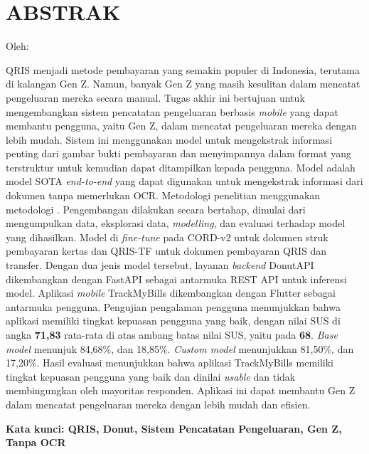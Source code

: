 \clearpage
\chapter*{ABSTRAK}
\begin{center}
	\center
	\begin{singlespace}
		\large\bfseries{\thetitle}

		\normalfont\normalsize
		Oleh:

		\bfseries \theauthor
	\end{singlespace}
\end{center}

\begin{singlespace}
	QRIS menjadi metode pembayaran yang semakin populer di Indonesia, terutama di kalangan Gen Z. Namun, banyak Gen Z yang masih kesulitan dalam mencatat pengeluaran mereka secara manual. Tugas akhir ini bertujuan untuk mengembangkan sistem pencatatan pengeluaran berbasis \emph{mobile} yang dapat membantu pengguna, yaitu Gen Z, dalam mencatat pengeluaran mereka dengan lebih mudah. Sistem ini menggunakan model \donut{} untuk mengekstrak informasi penting dari gambar bukti pembayaran dan menyimpannya dalam format yang terstruktur untuk kemudian dapat ditampilkan kepada pengguna. Model \donut{} adalah model SOTA \emph{end-to-end} yang dapat digunakan untuk mengekstrak informasi dari dokumen tanpa memerlukan OCR. Metodologi penelitian menggunakan metodologi \dsrm. Pengembangan dilakukan secara bertahap, dimulai dari mengumpulkan data, eksplorasi data, \emph{modelling}, dan evaluasi terhadap model yang dihasilkan. Model \donut{} di \emph{fine-tune} pada \dataset{} CORD-v2 untuk dokumen struk pembayaran kertas dan \dataset{} QRIS-TF untuk dokumen pembayaran QRIS dan transfer. Dengan dua jenis model tersebut, layanan \emph{backend} DonutAPI dikembangkan dengan FastAPI sebagai antarmuka REST API untuk inferensi model. Aplikasi \emph{mobile} TrackMyBills dikembangkan dengan Flutter sebagai antarmuka pengguna. Pengujian pengalaman pengguna menunjukkan bahwa aplikasi memiliki tingkat kepuasan pengguna yang baik, dengan nilai SUS di angka \textbf{71,83} rata-rata di atas ambang batas nilai SUS, yaitu pada \textbf{68}.  \emph{Base model} menunjuk \fscore{} 84,68\%, dan \mcer{} 18,85\%. \emph{Custom model} menunjukkan  \fscore{} 81,50\%, dan \mcer{} 17,20\%. Hasil evaluasi menunjukkan bahwa aplikasi TrackMyBills memiliki tingkat kepuasan pengguna yang baik dan dinilai \emph{usable} dan tidak membingungkan oleh mayoritas responden. Aplikasi ini dapat membantu Gen Z dalam mencatat pengeluaran mereka dengan lebih mudah dan efisien.

	\textbf{Kata kunci: QRIS, Donut, Sistem Pencatatan Pengeluaran, Gen Z, Tanpa OCR}

\end{singlespace}
\clearpage